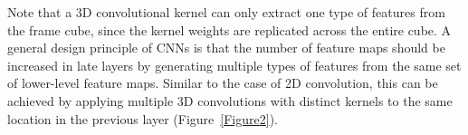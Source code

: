 \documentclass[10pt,twocolumn,letterpaper]{article}
\begin{document}
\par Note that a 3D convolutional kernel can only extract one type of features from the frame cube, since the kernel weights are replicated across the entire cube. A general design principle of CNNs is that the number of feature maps should be increased in late layers by
generating multiple types of features from the same set of lower-level feature maps. Similar to the case of 2D convolution, this can be achieved by applying multiple 3D convolutions with distinct kernels to the same location in the previous layer (Figure~\ref{Figure2}).



\end{document}
